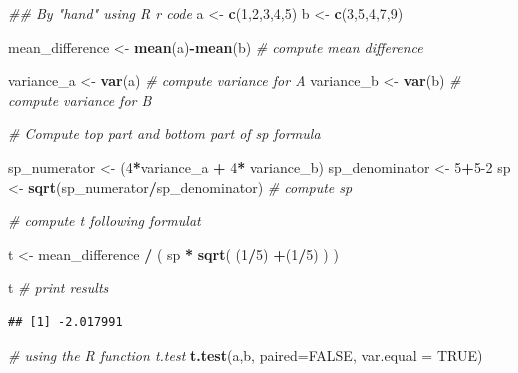 \documentclass[
]{book}
\newenvironment{Shaded}{\begin{snugshade}}{\end{snugshade}}
\newcommand{\CommentTok}[1]{\textcolor[rgb]{0.56,0.35,0.01}{\textit{#1}}}
\newcommand{\DataTypeTok}[1]{\textcolor[rgb]{0.13,0.29,0.53}{#1}}
\newcommand{\DecValTok}[1]{\textcolor[rgb]{0.00,0.00,0.81}{#1}}
\newcommand{\KeywordTok}[1]{\textcolor[rgb]{0.13,0.29,0.53}{\textbf{#1}}}
\newcommand{\NormalTok}[1]{#1}
\newcommand{\OperatorTok}[1]{\textcolor[rgb]{0.81,0.36,0.00}{\textbf{#1}}}
\newcommand{\OtherTok}[1]{\textcolor[rgb]{0.56,0.35,0.01}{#1}}
\newcommand{\StringTok}[1]{\textcolor[rgb]{0.31,0.60,0.02}{#1}}
\begin{document}
\begin{Shaded}
\begin{Highlighting}[]
\CommentTok{## By "hand" using R r code}
\NormalTok{a <-}\StringTok{ }\KeywordTok{c}\NormalTok{(}\DecValTok{1}\NormalTok{,}\DecValTok{2}\NormalTok{,}\DecValTok{3}\NormalTok{,}\DecValTok{4}\NormalTok{,}\DecValTok{5}\NormalTok{)}
\NormalTok{b <-}\StringTok{ }\KeywordTok{c}\NormalTok{(}\DecValTok{3}\NormalTok{,}\DecValTok{5}\NormalTok{,}\DecValTok{4}\NormalTok{,}\DecValTok{7}\NormalTok{,}\DecValTok{9}\NormalTok{)}

\NormalTok{mean_difference <-}\StringTok{ }\KeywordTok{mean}\NormalTok{(a)}\OperatorTok{-}\KeywordTok{mean}\NormalTok{(b) }\CommentTok{# compute mean difference}

\NormalTok{variance_a <-}\StringTok{ }\KeywordTok{var}\NormalTok{(a) }\CommentTok{# compute variance for A}
\NormalTok{variance_b <-}\StringTok{ }\KeywordTok{var}\NormalTok{(b) }\CommentTok{# compute variance for B}

\CommentTok{# Compute top part and bottom part of sp formula}

\NormalTok{sp_numerator <-}\StringTok{ }\NormalTok{(}\DecValTok{4}\OperatorTok{*}\NormalTok{variance_a }\OperatorTok{+}\StringTok{ }\DecValTok{4}\OperatorTok{*}\StringTok{ }\NormalTok{variance_b) }
\NormalTok{sp_denominator <-}\StringTok{ }\DecValTok{5}\OperatorTok{+}\DecValTok{5-2}
\NormalTok{sp <-}\StringTok{ }\KeywordTok{sqrt}\NormalTok{(sp_numerator}\OperatorTok{/}\NormalTok{sp_denominator) }\CommentTok{# compute sp}


\CommentTok{# compute t following formulat}

\NormalTok{t <-}\StringTok{ }\NormalTok{mean_difference }\OperatorTok{/}\StringTok{ }\NormalTok{( sp }\OperatorTok{*}\StringTok{ }\KeywordTok{sqrt}\NormalTok{( (}\DecValTok{1}\OperatorTok{/}\DecValTok{5}\NormalTok{) }\OperatorTok{+}\NormalTok{(}\DecValTok{1}\OperatorTok{/}\DecValTok{5}\NormalTok{) ) )}

\NormalTok{t }\CommentTok{# print results}
\end{Highlighting}
\end{Shaded}

\begin{verbatim}
## [1] -2.017991
\end{verbatim}

\begin{Shaded}
\begin{Highlighting}[]
\CommentTok{# using the R function t.test}
\KeywordTok{t.test}\NormalTok{(a,b, }\DataTypeTok{paired=}\OtherTok{FALSE}\NormalTok{, }\DataTypeTok{var.equal =} \OtherTok{TRUE}\NormalTok{)}
\end{Highlighting}
\end{Shaded}
\end{document}
